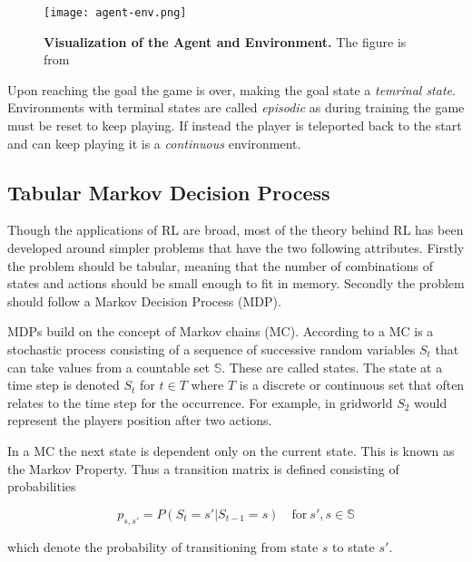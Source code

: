 \begin{figure}[H]
    \centering
    \texttt{[image: agent-env.png]}
    \captionsetup{width=.5\textwidth}
    \caption{\textbf{Visualization of the Agent and Environment.} The figure is from \citep[p.~48]{sutton_barto_2018}}
    \label{fig:agent-env}

\end{figure}


Upon reaching the goal the game is over, making the goal state a \textit{temrinal state}. Environments with terminal states are called \textit{episodic} as during training the game must be reset to keep playing. If instead the player is teleported back to the start and can keep playing it is a \textit{continuous} environment.

\subsection{Tabular Markov Decision Process}

Though the applications of RL are broad, most of the theory behind RL has been developed around simpler problems that have the two following attributes. Firstly the problem should be tabular, meaning that the number of combinations of states and actions should be small enough to fit in memory. Secondly the problem should follow a Markov Decision Process (MDP). \cite[p.~23]{barto_sutton_1983}\citep[p.~57]{powell_2011} 

MDPs build on the concept of Markov chains (MC). According to \cite{ross_2014} a MC is a stochastic process consisting of a sequence of successive random variables $S_t$ that can take values from a countable set $\mathbb{S}$. These are called states. The state at a time step is denoted $S_t$ for $t \in T$ where $T$ is a discrete or continuous set that often relates to the time step for the occurrence. For example, in gridworld $S_2$ would represent the players position after two actions.

In a MC the next state is dependent only on the current state. This is known as the Markov Property. Thus a transition matrix is defined consisting of probabilities

\begin{equation}
    p_{s,s'} = P(S_t=s'|S_{t-1}=s) \quad \text{for} ~ s',s \in \mathbb{S}
\end{equation}

which denote the probability of transitioning from state $s$ to state $s'$.

